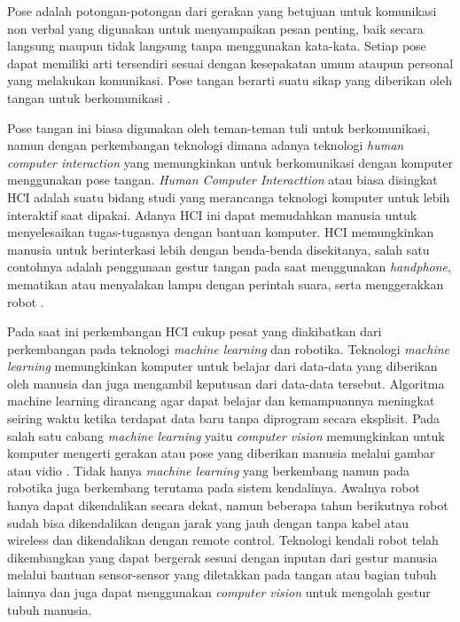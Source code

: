 Pose adalah potongan-potongan dari gerakan yang betujuan untuk komunikasi non verbal yang digunakan untuk menyampaikan pesan penting, baik secara langsung maupun tidak langsung tanpa menggunakan kata-kata. Setiap pose dapat memiliki arti tersendiri sesuai dengan kesepakatan umum ataupun personal yang melakukan komunikasi. Pose tangan berarti suatu sikap yang diberikan oleh tangan untuk berkomunikasi \parencite{gesturtangan}. \par
Pose tangan ini biasa digunakan oleh teman-teman tuli untuk berkomunikasi, namun dengan perkembangan teknologi dimana adanya teknologi \textit{human computer interaction} yang memungkinkan untuk berkomunikasi dengan komputer menggunakan pose tangan. \textit{Human Computer Interacttion} atau biasa disingkat HCI adalah suatu bidang studi yang merancanga teknologi komputer untuk lebih interaktif saat dipakai. Adanya HCI ini dapat memudahkan manusia untuk menyelesaikan tugas-tugasnya dengan bantuan komputer. HCI memungkinkan manusia untuk berinterkasi lebih dengan benda-benda disekitanya, salah satu contohnya adalah penggunaan gestur tangan pada saat menggunakan \textit{handphone}, mematikan atau menyalakan lampu dengan perintah suara, serta menggerakkan robot \parencite{HCI}. \par
Pada saat ini perkembangan HCI cukup pesat yang diakibatkan dari perkembangan pada teknologi \textit{machine learning} dan robotika. Teknologi \textit{machine learning} memungkinkan komputer untuk belajar dari data-data yang diberikan oleh manusia dan juga mengambil keputusan dari data-data tersebut. Algoritma machine learning dirancang agar dapat belajar dan kemampuannya meningkat seiring waktu ketika terdapat data baru tanpa diprogram secara eksplisit. Pada salah satu cabang \textit{machine learning} yaitu \textit{computer vision} memungkinkan untuk komputer mengerti gerakan atau pose yang diberikan manusia melalui gambar atau vidio \parencite{Bukusakti}. Tidak hanya \textit{machine learning} yang berkembang namun pada robotika juga berkembang terutama pada sistem kendalinya. Awalnya robot hanya dapat dikendalikan secara dekat, namun beberapa tahun berikutnya robot sudah bisa dikendalikan dengan jarak yang jauh dengan tanpa kabel atau wireless dan dikendalikan dengan remote control. Teknologi kendali robot telah dikembangkan yang dapat bergerak sesuai dengan inputan dari gestur manusia melalui bantuan sensor-sensor yang diletakkan pada tangan atau bagian tubuh lainnya dan juga dapat menggunakan \textit{computer vision} untuk mengolah gestur tubuh manusia.
 


